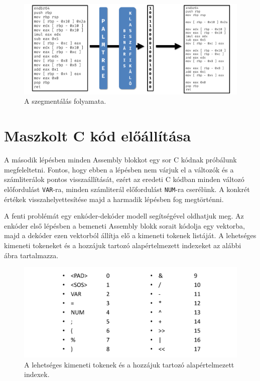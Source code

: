 \begin{figure}[H]
	\centering
	\includegraphics[width=1\textwidth]{images/segmentation_fig.pdf}
	\caption{A szegmentálás folyamata.}
	\label{fig:segmentation_fig}
\end{figure}

\section{Maszkolt C kód előállítása}
A második lépésben minden Assembly blokkot egy sor C kódnak próbálunk
megfeleltetni. Fontos, hogy ebben a lépésben nem várjuk el a változók és
a számliterálok pontos visszaállítását, ezért az eredeti C kódban minden
változó előfordulást \texttt{VAR}-ra, minden számliterál előfordulást
\texttt{NUM}-ra cserélünk. A konkrét értékek visszahelyettesítése majd
a harmadik lépésben fog megtörténni.

A fenti problémát egy enkóder-dekóder modell segítségével oldhatjuk meg. Az enkóder
első lépésben a bemeneti Assembly blokk sorait kódolja egy vektorba, majd
a dekóder ezen vektorból állítja elő a kimeneti tokenek listáját. A lehetséges
kimeneti tokeneket és a hozzájuk tartozó alapértelmezett indexeket az alábbi ábra
tartalmazza.

\begin{figure}[H]
	\centering
	\includegraphics[width=1\textwidth,frame]{images/tokens.pdf}
	\caption{A lehetséges kimeneti tokenek és a hozzájuk tartozó alapértelmezett indexek.}
	\label{fig:tokens}
\end{figure}

